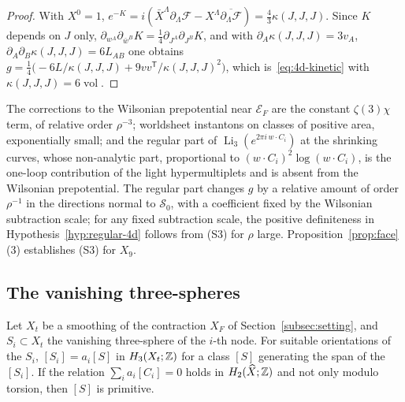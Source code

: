 \begin{proof}
With $X^0=1$, $e^{-K}=i(\bar X^\Lambda\partial_\Lambda\mathcal F-X^\Lambda\overline{\partial_\Lambda\mathcal F})
=\tfrac43\kappa(J,J,J)$. Since $K$ depends on $J$ only,
$\partial_{w^A}\partial_{\bar w^B}K=\tfrac14\partial_{J^A}\partial_{J^B}K$, and with
$\partial_A\kappa(J,J,J)=3v_A$, $\partial_A\partial_B\kappa(J,J,J)=6L_{AB}$ one obtains
$g=\tfrac14\bigl(-6L/\kappa(J,J,J)+9vv^{\mathsf T}/\kappa(J,J,J)^2\bigr)$, which
is~\eqref{eq:4d-kinetic} with $\kappa(J,J,J)=6\operatorname{vol}$.
\end{proof}

The corrections to the Wilsonian prepotential near $\mathcal E_F$ are the constant $\zeta(3)\chi$ term, of
relative order $\rho^{-3}$; worldsheet instantons on classes of positive area, exponentially small; and the
regular part of $\operatorname{Li}_3(e^{2\pi i\,w\cdot C_i})$ at the shrinking curves, whose non-analytic part,
proportional to $(w\cdot C_i)^2\log(w\cdot C_i)$, is the one-loop contribution of the light hypermultiplets
and is absent from the Wilsonian prepotential. The regular part changes $g$ by a relative amount of order
$\rho^{-1}$ in the directions normal to $\mathcal S_0$, with a coefficient fixed by the Wilsonian
subtraction scale; for any fixed subtraction scale, the positive definiteness in
Hypothesis~\ref{hyp:regular-4d} follows from (S3) for $\rho$ large. Proposition~\ref{prop:face}(3)
establishes (S3) for $X_9$.

\subsection{The vanishing three-spheres}
\label{subsec:spheres}

\begin{lemma}\label{lem:spheres}
Let $X_t$ be a smoothing of the contraction $X_F$ of Section~\ref{subsec:setting}, and $S_i\subset
X_t$ the vanishing three-sphere of the $i$-th node. For suitable orientations of the $S_i$,
$[S_i]=a_i[S]$ in $H_3(X_t;\mathbb Z)$ for a class $[S]$ generating the span of the $[S_i]$. If the relation
$\sum_ia_i[C_i]=0$ holds in $H_2(\widehat X;\mathbb Z)$ and not only modulo torsion, then $[S]$ is primitive.
\end{lemma}

